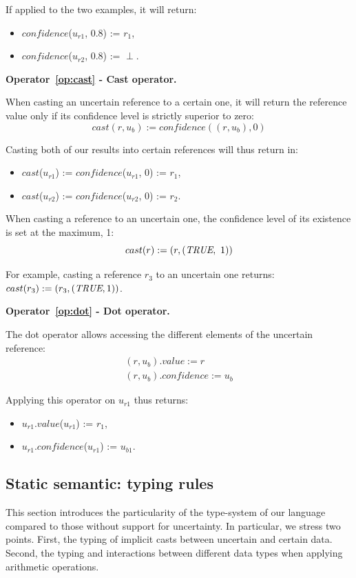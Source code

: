 If applied to the two examples, it will return:
\begin{itemize}
    \item $confidence$($u_{r1}$, 0.8) := $r_1$,
    \item $confidence$($u_{r2}$, 0.8) := $\perp$.
\end{itemize}

\bigskip

\noindent\textbf{Operator~\ref{op:cast} - Cast operator.~}

When casting an uncertain reference to a certain one, it will return the reference value only if its  confidence level is strictly superior to zero:
$$cast(r, u_b) := confidence((r, u_b), 0)$$

Casting both of our results into certain references will thus return in:
\begin{itemize}
    \item $cast$($u_{r1}$) := $confidence$($u_{r1}$, 0) := $r_1$,
    \item $cast$($u_{r2}$) := $confidence$($u_{r2}$, 0) := $r_2$.
\end{itemize}

When casting a reference to an uncertain one, the confidence level of its existence is set at the maximum, 1:
$$cast(r) := (r, (\textit{TRUE}{},~1))$$

For example, casting a reference $r_3$ to an uncertain one returns: $cast(r_3) := (r_3, (\textit{TRUE}{}, 1))$.

\bigskip

\noindent\textbf{Operator~\ref{op:dot} - Dot operator.~}

The dot operator allows accessing the different elements of the uncertain reference: 
\begin{align*}
	(r, u_b).value := r\\
	(r, u_b).confidence := u_b
\end{align*}

Applying this operator on $u_{r1}$ thus returns:
\begin{itemize}
	\item $u_{r1}$.$value$($u_{r1}$) := $r_1$,
	\item $u_{r1}$.$confidence$($u_{r1}$) := $u_{b1}$.
\end{itemize}

\subsection{Static semantic: typing rules}
\label{subsec:type-system}
This section introduces the particularity of the type-system of our language compared to those without support for uncertainty. 
In particular, we stress two points.
First, the typing of implicit casts between uncertain and certain data.
Second, the typing and interactions between different data types when applying arithmetic operations.


